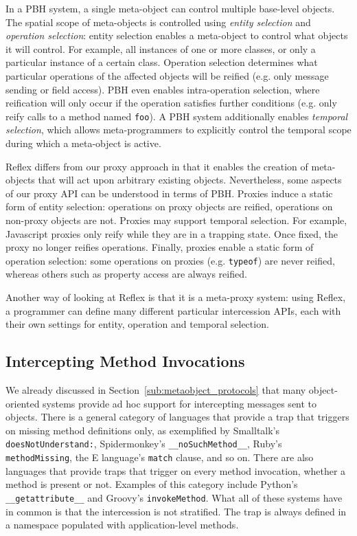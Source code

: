 \documentclass{acm_proc_article-sp}
\newcommand{\noSuchMethod}{\texttt{\_\_noSuchMethod\_\_}}
\begin{document}
In a PBH system, a single meta-object can control multiple base-level objects. The spatial scope of meta-objects is controlled using \emph{entity selection} and \emph{operation selection}: entity selection enables a meta-object to control what objects it will control. For example, all instances of one or more classes, or only a particular instance of a certain class. Operation selection determines what particular operations of the affected objects will be reified (e.g. only message sending or field access). PBH even enables intra-operation selection, where reification will only occur if the operation satisfies further conditions (e.g. only reify calls to a method named \texttt{foo}). A PBH system additionally enables \emph{temporal selection}, which allows meta-programmers to explicitly control the temporal scope during which a meta-object is active.

Reflex differs from our proxy approach in that it enables the creation of meta-objects that will act upon arbitrary existing objects. Nevertheless, some aspects of our proxy API can be understood in terms of PBH. Proxies induce a static form of entity selection: operations on proxy objects are reified, operations on non-proxy objects are not. Proxies may support temporal selection. For example, Javascript proxies only reify while they are in a trapping state. Once fixed, the proxy no longer reifies operations. Finally, proxies enable a static form of operation selection: some operations on proxies (e.g. \texttt{typeof}) are never reified, whereas others such as property access are always reified.

Another way of looking at Reflex is that it is a meta-proxy system: using Reflex, a programmer can define many different particular intercession APIs, each with their own settings for entity, operation and temporal selection.

\subsection{Intercepting Method Invocations}

We already discussed in Section~\ref{sub:metaobject_protocols} that many object-oriented systems provide ad hoc support for intercepting messages sent to objects. There is a general category of languages that provide a trap that triggers on missing method definitions only, as exemplified by Smalltalk's \texttt{doesNotUnderstand:}, Spidermonkey's \noSuchMethod{}, Ruby's \texttt{methodMissing}, the E language's \texttt{match} clause, and so on. There are also languages that provide traps that trigger on every method invocation, whether a method is present or not. Examples of this category include Python's \texttt{\_\_getattribute\_\_} and Groovy's \texttt{invokeMethod}. What all of these systems have in common is that the intercession is not stratified. The trap is always defined in a namespace populated with application-level methods.
\end{document}
